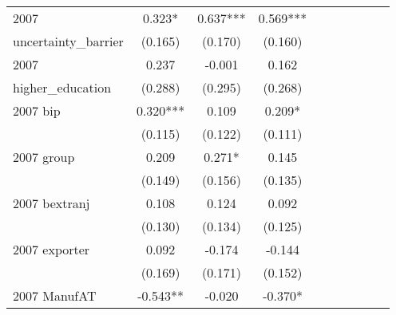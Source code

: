 \begin{table}[htbp]
\begin{tabular}{l*{9}{c}}
2007                &       0.323*  &       0.637***&       0.569***&               &               &               &               &               &               \\
uncertainty\_barrier &     (0.165)   &     (0.170)   &     (0.160)   &               &               &               &               &               &               \\
2007                &       0.237   &      -0.001   &       0.162   &               &               &               &               &               &               \\
higher\_education    &     (0.288)   &     (0.295)   &     (0.268)   &               &               &               &               &               &               \\
2007 bip            &       0.320***&       0.109   &       0.209*  &               &               &               &               &               &               \\
                    &     (0.115)   &     (0.122)   &     (0.111)   &               &               &               &               &               &               \\
2007 group          &       0.209   &       0.271*  &       0.145   &               &               &               &               &               &               \\
                    &     (0.149)   &     (0.156)   &     (0.135)   &               &               &               &               &               &               \\
2007 bextranj       &       0.108   &       0.124   &       0.092   &               &               &               &               &               &               \\
                    &     (0.130)   &     (0.134)   &     (0.125)   &               &               &               &               &               &               \\
2007 exporter       &       0.092   &      -0.174   &      -0.144   &               &               &               &               &               &               \\
                    &     (0.169)   &     (0.171)   &     (0.152)   &               &               &               &               &               &               \\
2007 ManufAT        &      -0.543** &      -0.020   &      -0.370*  &               &               &               &               &               &               \\

\end{tabular}
\end{table}
